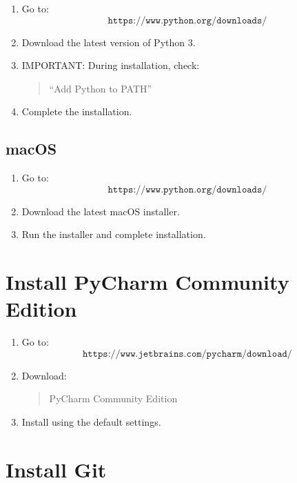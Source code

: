 \documentclass[11pt]{article}
\begin{document}
\begin{enumerate}
    \item Go to:
    \[
    \texttt{https://www.python.org/downloads/}
    \]

    \item Download the latest version of Python 3.

    \item IMPORTANT: During installation, check:
    \begin{quote}
    ``Add Python to PATH''
    \end{quote}

    \item Complete the installation.
\end{enumerate}

\subsection{macOS}

\begin{enumerate}
    \item Go to:
    \[
    \texttt{https://www.python.org/downloads/}
    \]

    \item Download the latest macOS installer.

    \item Run the installer and complete installation.
\end{enumerate}

\section{Install PyCharm Community Edition}

\begin{enumerate}
    \item Go to:
    \[
    \texttt{https://www.jetbrains.com/pycharm/download/}
    \]

    \item Download:
    \begin{quote}
    PyCharm Community Edition
    \end{quote}

    \item Install using the default settings.
\end{enumerate}

\section{Install Git}
\end{document}
